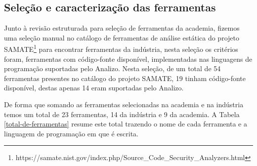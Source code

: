 \subsection{Seleção e caracterização das ferramentas}

Junto à revisão estruturada para seleção de ferramentas da academia, fizemos
uma seleção manual no catálogo de ferramentas de análise estática do projeto
SAMATE\footnote{https://samate.nist.gov/index.php/Source\_Code\_Security\_Analyzers.html}
para encontrar ferramentas da indústria, nesta seleção os critérios foram,
ferramentas com código-fonte disponível, implementadas nas linguagens de
programação suportadas pelo Analizo. Nesta seleção, de um total de 54 ferramentas
presentes no catálogo do projeto SAMATE, 19 tinham código-fonte
disponível, destas apenas 14 eram suportadas pelo Analizo.

De forma que somando as ferramentas selecionadas na academia e na indústria
temos um total de 23 ferramentas, 14 da indústria e 9 da academia.  A
Tabela \ref{total-de-ferramentas} resume este total trazendo o nome de cada
ferramenta e a linguagem de programação em que é escrita.

